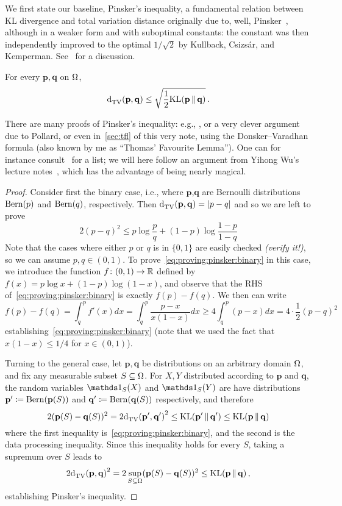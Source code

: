 \documentclass[10pt]{article}
\renewcommand{\eqdef}{\coloneqq}
\newcommand{\p}{\mathbf{p}}
\newcommand{\q}{\mathbf{q}}
\begin{document}
  We first state our baseline, Pinsker's inequality, a fundamental relation between KL divergence and total variation distance originally due to, well, Pinsker~\cite{Pinsker64}, although in a weaker form and with suboptimal constants: the constant was then independently improved to the optimal $1/\sqrt{2}$ by Kullback, Csizs\'ar, and Kemperman. See~\cite[Section~2.8]{Tsybakov09} for a discussion.
\begin{lemma}
  \label{lemma:pinsker}
For every $\p,\q$ on $\Omega$, 
\begin{equation}
  \label{eq:pinsker}
  \totalvardist{\p}{\q} \leq \sqrt{\frac{1}{2}\kldiv{\p}{\q}}\,.
\end{equation}
\end{lemma}
There are many proofs of Pinsker's inequality: e.g., \cite[Lemma~2.5]{Tsybakov09}, or a very clever argument due to Pollard, or even in~\autoref{sec:tfl} of this very note, using the Donsker--Varadhan formula (also known by me as ``Thomas' Favourite Lemma''). One can for instance consult~\cite{IlyaRaz:MO} for a list; we will here follow an argument from Yihong Wu's lecture notes~\cite[Theorem~4.5]{Wu20}, which has the advantage of being nearly magical.
\begin{proof}
Consider first the binary case, i.e., where $\p$,$\q$ are Bernoulli distributions $\operatorname{Bern}\!\left( p \right)$ and $\operatorname{Bern}\!\left( q \right)$, respectively. Then 
$
    \totalvardist{\p}{\q} = \abs{p-q}
$
and so we are left to prove
\begin{equation}
  \label{eq:proving:pinsker:binary}
    2(p-q)^2 \leq p\log\frac{p}{q} + (1-p)\log\frac{1-p}{1-q}
\end{equation}
Note that the cases where either $p$ or $q$ is in $\{0,1\}$ are easily checked \textit{(verify it!)}, so we can assume $p,q\in(0,1)$. 
To prove~\eqref{eq:proving:pinsker:binary} in this case, we introduce the function $f\colon(0,1)\to\mathbb{R}$ defined by $f(x) = p\log x + (1-p)\log(1-x)$, and observe that the RHS of~\eqref{eq:proving:pinsker:binary} is exactly $f(p)-f(q)$. We then can write
\[
    f(p)-f(q) = \int_{q}^p f'(x)dx = \int_{q}^p \frac{p-x}{x(1-x)}dx \geq 4\int_{q}^p (p-x)dx = 4\cdot \frac{1}{2}(p-q)^2
\]
establishing~\eqref{eq:proving:pinsker:binary} (note that we used the fact that $x(1-x) \leq 1/4$ for $x\in(0,1)$).\smallskip

Turning to the general case, let $\p,\q$ be distributions on an arbitrary domain $\Omega$, and fix any measurable subset $S\subseteq \Omega$. For $X,Y$ distributed according to $\p$ and $\q$, the random variables $\indicSet{S}(X)$ and $\indicSet{S}(Y)$ are have distributions $\p'\eqdef \bernoulli{\p(S)}$ and $\q' \eqdef \bernoulli{\q(S)}$ respectively, and therefore
\[
    2(\p(S)-\q(S))^2 = 2\totalvardist{\p'}{\q'}^2 \leq \kldiv{\p'}{\q'} \leq \kldiv{\p}{\q}
\]
where the first inequality is~\eqref{eq:proving:pinsker:binary}, and the second is the data processing inequality. Since this inequality holds for every $S$, taking a supremum over $S$ leads to
\[
    2\totalvardist{\p}{\q}^2 = 2\sup_{S\subseteq\domain}(\p(S)-\q(S))^2 \leq \kldiv{\p}{\q}\,,
\]
establishing Pinsker's inequality.
\end{proof}
\end{document}
